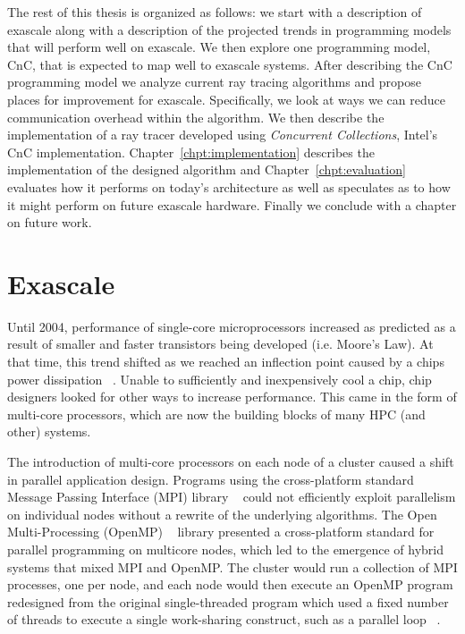 The rest of this thesis is organized as follows: we start with a description of
exascale along with a description of the projected trends in programming models
that will perform well on exascale.  We then explore one programming model,
CnC, that is expected to map well to exascale systems.  After describing the
CnC programming model we analyze current ray tracing algorithms and propose
places for improvement for exascale.  Specifically, we look at ways we can
reduce communication overhead within the algorithm.  We then describe the
implementation of a ray tracer developed using \emph{Concurrent Collections},
Intel's CnC implementation.  Chapter~\ref{chpt:implementation} describes the
implementation of the designed algorithm and Chapter~\ref{chpt:evaluation}
evaluates how it performs on today's architecture as well as speculates as to
how it might perform on future exascale hardware.  Finally we conclude with a
chapter on future work.

\section{Exascale}
\label{sec:exascale}

Until 2004, performance of single-core microprocessors increased as
predicted as a result of smaller and faster transistors being
developed (i.e. Moore's Law). At that time, this trend shifted as we
reached an inflection point caused by a chips power dissipation
~\cite{article-kogge}. Unable to sufficiently and inexpensively
cool a chip, chip designers looked for other ways to increase
performance. This came in the form of multi-core processors, which are
now the building blocks of many HPC (and other) systems.

The introduction of multi-core processors on each node of a cluster
caused a shift in parallel application design. Programs using the
cross-platform standard Message Passing Interface (MPI) library
~\cite{book-snir} could not efficiently exploit parallelism
on individual nodes without a rewrite of the underlying algorithms.
The Open Multi-Processing (OpenMP) ~\cite{openmp08} library presented
a cross-platform standard for parallel programming on multicore nodes,
which led to the emergence of hybrid systems that mixed MPI and
OpenMP. The cluster would run a collection of MPI processes, one per
node, and each node would then execute an OpenMP program redesigned
from the original single-threaded program which used a fixed number of
threads to execute a single work-sharing construct, such as a parallel
loop ~\cite{article-gropp}.

